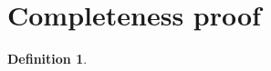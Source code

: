 \documentclass[11pt]{article}
\newtheorem{definition}{Definition}[section]
\begin{document}
\section{Completeness proof}\label{sec:compl}    

\begin{definition}
    
\end{definition}



\end{document}
